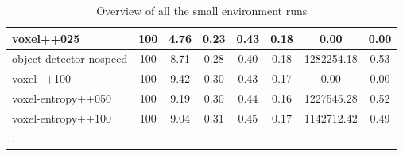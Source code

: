 \begin{table}
\begin{longtable}{|l|c|c| c|c| c|c|c|}
        voxel++025 & 100 & {\cellcolor[HTML]{A0CEC5}} \color[HTML]{000000} 4.76 & {\cellcolor[HTML]{99CBC0}} \color[HTML]{000000} 0.23 & {\cellcolor[HTML]{B9DAD3}} \color[HTML]{000000} 0.43 & 0.18 & 0.00 & 0.00 \\ \hline
        object-detector-nospeed & 100 & {\cellcolor[HTML]{60AFA0}} \color[HTML]{F1F1F1} 8.71 & {\cellcolor[HTML]{6FB6A8}} \color[HTML]{F1F1F1} 0.28 & {\cellcolor[HTML]{BEDCD6}} \color[HTML]{000000} 0.40 & 0.18 & 1282254.18 & 0.53 \\ \hline
        voxel++100 & 100 & {\cellcolor[HTML]{55AA99}} \color[HTML]{F1F1F1} 9.42 & {\cellcolor[HTML]{5DAE9D}} \color[HTML]{F1F1F1} 0.30 & {\cellcolor[HTML]{B9DAD3}} \color[HTML]{000000} 0.43 & 0.17 & 0.00 & 0.00 \\ \hline
        voxel-entropy++050 & 100 & {\cellcolor[HTML]{59AC9B}} \color[HTML]{F1F1F1} 9.19 & {\cellcolor[HTML]{59AC9B}} \color[HTML]{F1F1F1} 0.30 & {\cellcolor[HTML]{B7D9D2}} \color[HTML]{000000} 0.44 & 0.16 & 1227545.28 & 0.52 \\ \hline
        voxel-entropy++100 & 100 & {\cellcolor[HTML]{5BAD9C}} \color[HTML]{F1F1F1} 9.04 & {\cellcolor[HTML]{55AA99}} \color[HTML]{F1F1F1} 0.31 & {\cellcolor[HTML]{B4D8D0}} \color[HTML]{000000} 0.45 & 0.17 & 1142712.42 & 0.49 \\ \hline
        
        \caption{Overview of all the small environment runs}.
        \label{tab:results-small-env-voxel}
    \end{longtable}

\end{table}


\newpage


